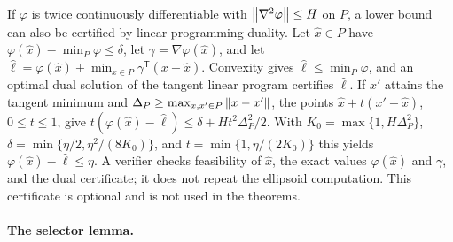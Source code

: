 \begin{remark}\label{rem:points-tangent}
If $\varphi$ is twice continuously differentiable with
$\left\lVert\nabla^2\varphi\right\rVert\le H$ on $P$, a lower bound can also be certified
by linear programming duality. Let $\hat x\in P$ have
$\varphi(\hat x)-\min_P\varphi\le\delta$, let
$\gamma=\nabla\varphi(\hat x)$, and let $\hat\ell=\varphi(\hat x)+
\min_{x\in P}\gamma^{\mathsf T}(x-\hat x)$. Convexity gives
$\hat\ell\le\min_P\varphi$, and an optimal dual solution of the tangent
linear program certifies $\hat\ell$. If $x'$ attains the tangent minimum
and $\Delta_P\ge\max_{x,x'\in P}\left\lVert x-x'\right\rVert$, the points
$\hat x+t(x'-\hat x)$, $0\le t\le1$, give
$t(\varphi(\hat x)-\hat\ell)\le\delta+Ht^2\Delta_P^2/2$. With
$K_0=\max\{1,H\Delta_P^2\}$, $\delta=\min\{\eta/2,\eta^2/(8K_0)\}$, and
$t=\min\{1,\eta/(2K_0)\}$ this yields $\varphi(\hat x)-\hat\ell\le\eta$.
A verifier checks feasibility of $\hat x$, the exact values $\varphi(\hat
x)$ and $\gamma$, and the dual certificate; it does not repeat the
ellipsoid computation. This certificate is optional and is not used in the
theorems.
\end{remark}

\paragraph{The selector lemma.}

